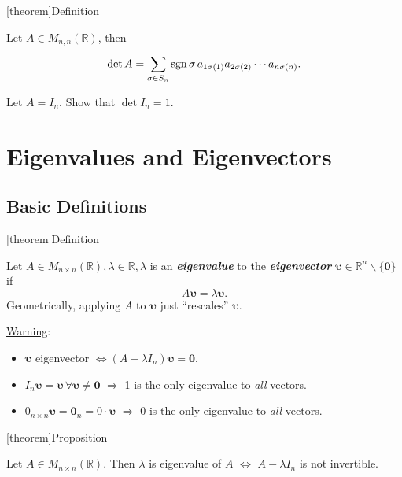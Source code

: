 \documentclass[12pt]{report}
\theoremstyle{definition}
\begin{document}
[theorem]{Definition}
\begin{det of A}
    Let $A \in M_{n,n}(\mathbb{R})$, then \[\det{A} = 
    \sum_{\sigma \in S_n}^{} \textnormal{sgn}\,\sigma\, a_{1\sigma(1)}a_{2\sigma(2)}\cdots a_{n\sigma(n)}.\]
\end{det of A}

\begin{ex}
        Let $A = I_n$. Show that $\det{I_n} = 1$.
\end{ex}

\section{Eigenvalues and Eigenvectors}

\subsection{Basic Definitions}

[theorem]{Definition}
\begin{eigenvalue and vector}
    Let $A \in M_{n\times n}(\mathbb{R}), \lambda \in \mathbb{R}, \lambda$ is an \textbf{\emph{eigenvalue}}
    to the \textbf{\emph{eigenvector}} $\pmb{\upsilon} \in \mathbb{R}^{n}\backslash\{\pmb{0}\}$ if\[
        A\pmb{\upsilon} = \lambda\pmb{\upsilon}.
    \]
    Geometrically, applying $A$ to $\pmb{\upsilon}$ just ``rescales'' $\pmb{\upsilon}$.
\end{eigenvalue and vector}

\underline{Warning}:
\begin{itemize}
    \item $\pmb{\upsilon}$ eigenvector $\iff (A-\lambda I_n)\pmb{\upsilon} = \pmb{0}$.
    \item $I_n \pmb{\upsilon} = \pmb{\upsilon} \,\forall \pmb{\upsilon} \neq \pmb{0}$
        $\Rightarrow{}$ 1 is the only eigenvalue to \emph{all} vectors.
    \item $0_{n\times n} \pmb{\upsilon} = \pmb{0}_n = 0\cdot\pmb{\upsilon}$ 
        $\Rightarrow{}$ 0 is the only eigenvalue to \emph{all} vectors.
\end{itemize}

[theorem]{Proposition}
\begin{eigenvalue property}
    Let $A \in M_{n\times n}(\mathbb{R})$.
    Then $\lambda$ is eigenvalue of $A$ $\iff$ $A-\lambda I_n$ is not invertible.
\end{eigenvalue property}
\end{document}
